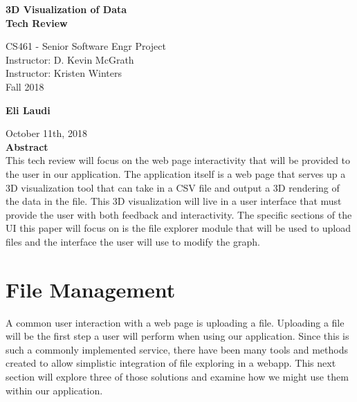 \documentclass[journal,10pt,onecolumn,compsoc]{IEEEtran}
\begin{document}
\begin{titlepage}
\begin{center}
  
  \textbf{}

  \vspace{6cm}
  \Huge{}
  \textbf{3D Visualization of Data \\ Tech Review}
  \vspace{3cm}

 
  \LARGE
  CS461 - Senior Software Engr Project\\
  \vspace{0.25cm}
  Instructor: D. Kevin McGrath \\
  Instructor: Kristen Winters \\
  \vspace{0.25cm}
  Fall 2018 \\
  \vspace{1.5cm}
  
  \normalsize
  \textbf{Eli Laudi}
  \date{October 9th, 2018}
  \vfill
  October 11th, 2018\\
  \vspace{1cm}
  \vspace*{\fill}
  \textbf{Abstract} \\
  \normalsize
  This tech review will focus on the web page interactivity that will be provided to the user in our application. The application itself is a web page that serves up a 3D visualization tool that can take in a CSV file and output a 3D rendering of the data in the file. This 3D visualization will live in a user interface that must provide the user with both feedback and interactivity. The specific sections of the UI this paper will focus on is the file explorer module that will be used to upload files and the interface the user will use to modify the graph.
  \end{center}
  \end{titlepage}
  
\section{File Management}
A common user interaction with a web page is uploading a file. Uploading a file will be the first step a user will perform when using our application. Since this is such a commonly implemented service, there have been many tools and methods created to allow simplistic integration of file exploring in a webapp. This next section will explore three of those solutions and examine how we might use them within our application.
\end{document}
